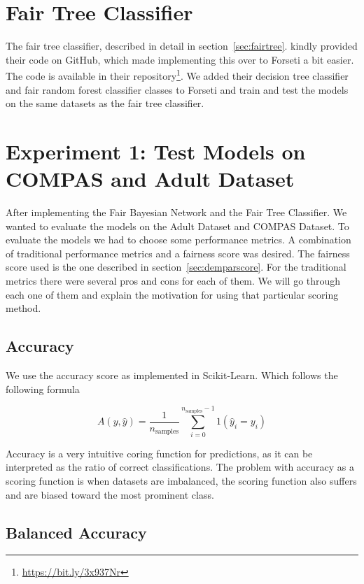 \section{Fair Tree Classifier}
The fair tree classifier, described in detail in section~\ref{sec:fairtree}. \citet{Antonio:2021:arXiv} kindly provided their code on GitHub, which made implementing this over to Forseti a bit easier. The code is available in their repository\footnote{\url{https://bit.ly/3x937Nr}}. We added their decision tree classifier and fair random forest classifier classes to Forseti and train and test the models on the same datasets as the fair tree classifier.

\section{Experiment 1: Test Models on COMPAS and Adult Dataset}
\label{sec:AdultAdultFairnessAssessment}
After implementing the Fair Bayesian Network and the Fair Tree Classifier. We wanted to evaluate the models on the Adult Dataset and COMPAS Dataset. To evaluate the models we had to choose some performance metrics. A combination of traditional performance metrics and a fairness score was desired. The fairness score used is the one described in section~\ref{sec:demparscore}. For the traditional metrics there were several pros and cons for each of them. We will go through each one of them and explain the motivation for using that particular scoring method.

\subsection{Accuracy}

We use the accuracy score as implemented in Scikit-Learn. Which follows the following formula

\begin{equation*}
    A(y, \hat{y}) = \frac{1}{n_\text{samples}} \sum_{i=0}^{n_\text{samples} - 1} 1(\hat{y}_i = y_i)
\end{equation*}

Accuracy is a very intuitive coring function for predictions, as it can be interpreted as the ratio of correct classifications. The problem with accuracy as a scoring function is when datasets are imbalanced, the scoring function also suffers and are biased toward the most prominent class.

\subsection{Balanced Accuracy}

